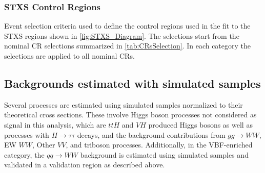 \subsubsection{STXS Control Regions}
\label{subsubsec:stxs-crs}

\begin{table}[ht]
    \caption{
      Event selection criteria used to define the control regions used in the fit to the STXS regions shown in \cref{fig:STXS_Diagram}.
      The selections start from the nominal CR selections summarized in \cref{tab:CRsSelection}.
      In each category the selections are applied to all nominal CRs. 
      }
  \label{tab:STXSCRsSelection}
  \centering
  \resizebox{\textwidth}{!}{
  
  }
  \end{table}


\subsection{Backgrounds estimated with simulated samples}
Several processes are estimated using simulated samples normalized to their theoretical cross sections. These involve Higgs boson processes not considered as signal in this analysis, which are $ttH$ and $VH$ produced Higgs bosons as well as processes with $H\to\tau\tau$ decays, and the background contributions from $gg \to WW$, EW $WW$, Other $VV$, and triboson processes. Additionally, in the VBF-enriched \TwoJet category, the $qq \to WW$ background is estimated using simulated samples and validated in a validation region as described above.

